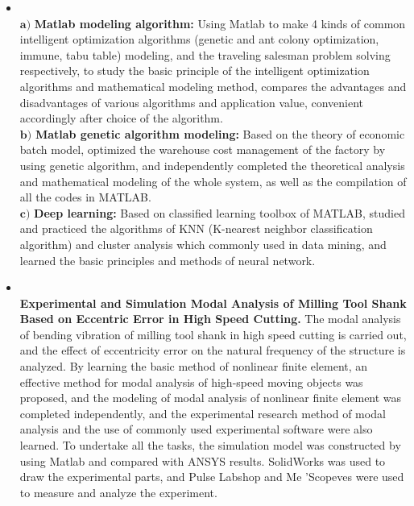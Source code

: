 \documentclass{resume}
\begin{document}
\begin{itemize}
	\item 
	\\
	$ \mathbf{a)}  $ \textbf{Matlab modeling algorithm: } Using Matlab to make 4 kinds of common intelligent optimization algorithms (genetic and ant colony optimization, immune, tabu table) modeling, and the traveling salesman problem solving respectively, to study the basic principle of the intelligent optimization algorithms and mathematical modeling method, compares the advantages and disadvantages of various algorithms and application value, convenient accordingly after choice of the algorithm.\\
	$ \mathbf{b)}  $ \textbf{Matlab genetic algorithm modeling: } Based on the theory of economic batch model, optimized the warehouse cost management of the factory by using genetic algorithm, and independently completed the theoretical analysis and mathematical modeling of the whole system, as well as the compilation of all the codes in MATLAB. \\
	$ \mathbf{c)}  $ \textbf{Deep learning: } Based on classified learning toolbox of MATLAB, studied and practiced the algorithms of KNN (K-nearest neighbor classification algorithm) and cluster analysis which commonly used in data mining, and learned the basic principles and methods of neural network.
	
	\item 
	\\
	\textbf{Experimental and Simulation Modal Analysis of Milling Tool Shank Based on Eccentric Error in High Speed Cutting.} The modal analysis of bending vibration of milling tool shank in high speed cutting is carried out, and the effect of eccentricity error on the natural frequency of the structure is analyzed. By learning the basic method of nonlinear finite element, an effective method for modal analysis of high-speed moving objects was proposed, and the modeling of modal analysis of nonlinear finite element was completed independently, and the experimental research method of modal analysis and the use of commonly used experimental software were also learned.
	To undertake all the tasks, the simulation model was constructed by using Matlab and compared with ANSYS results. SolidWorks was used to draw the experimental parts, and Pulse Labshop and Me 'Scopeves were used to measure and analyze the experiment.
	

\end{itemize}
\end{document}
